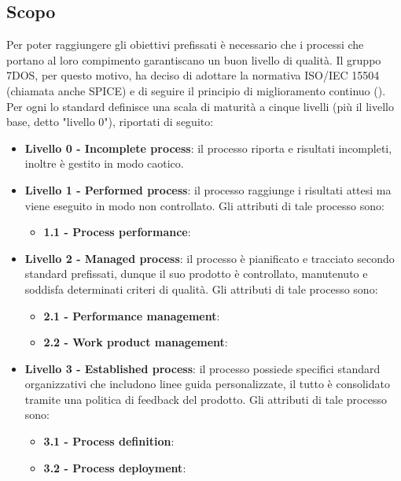 
\subsection{Scopo}
	Per poter raggiungere gli obiettivi prefissati è necessario che i processi che portano al loro compimento garantiscano un buon livello  	di qualità. Il gruppo 7DOS, per questo motivo, ha deciso di adottare la normativa ISO/IEC 15504 (chiamata anche SPICE) e di 	seguire il principio di miglioramento continuo (). \\ Per ogni  lo standard definisce una scala di maturità a cinque livelli (più il livello base, detto "livello 0"), riportati di seguito:
	
	\begin{itemize}
	\item \textbf {Livello 0 - Incomplete process}: il processo riporta  e risultati incompleti, inoltre è gestito in modo caotico.
	\item \textbf {Livello 1 - Performed process}:  il processo raggiunge i risultati attesi ma viene eseguito in modo non controllato. Gli attributi di tale processo sono:
		\begin{itemize}
		\item \textbf{1.1 - Process performance}: 
		\end{itemize}
	\item \textbf {Livello 2 - Managed process}: il processo è pianificato e tracciato secondo standard prefissati, dunque il suo prodotto è controllato, manutenuto e soddisfa determinati criteri di qualità. Gli attributi di tale processo sono:
		\begin{itemize}
		\item \textbf{2.1 - Performance management}:
		\item \textbf{2.2 - Work product management}:
		\end{itemize}
	\item \textbf {Livello 3 - Established process}: il processo possiede specifici standard organizzativi che includono linee guida personalizzate, il tutto è consolidato tramite una politica di feedback del prodotto. Gli attributi di tale processo sono:
		\begin{itemize}
		\item \textbf{3.1 - Process definition}:
		\item \textbf{3.2 - Process deployment}:
		\end{itemize}

\end{itemize}

